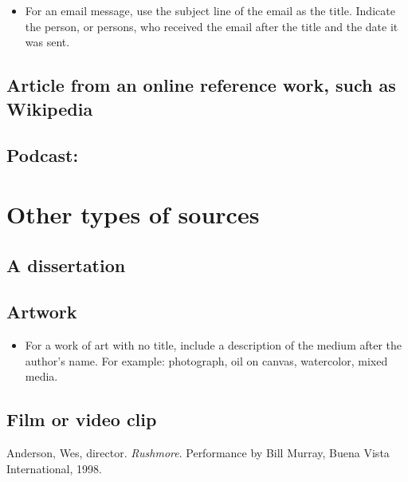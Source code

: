 {\begin{itemize}
\item For an email message, use the subject line of the email as the title. Indicate the person, or persons, who received the email after the title and the date it was sent.
\end{itemize}



\subsection{Article from an online reference work, such as Wikipedia}



\subsection{Podcast:}

\section{Other types of sources}

\subsection{A dissertation}

\subsection{Artwork}

\begin{itemize}\item For a work of art with no title, include a description of the medium after the author's name. For example: photograph, oil on canvas, watercolor, mixed media. \end{itemize}

\subsection{Film or video clip}
\bigskip

\noindent Anderson, Wes, director. \emph{Rushmore}. Performance by Bill Murray, Buena Vista International, 1998.}\bigskip

